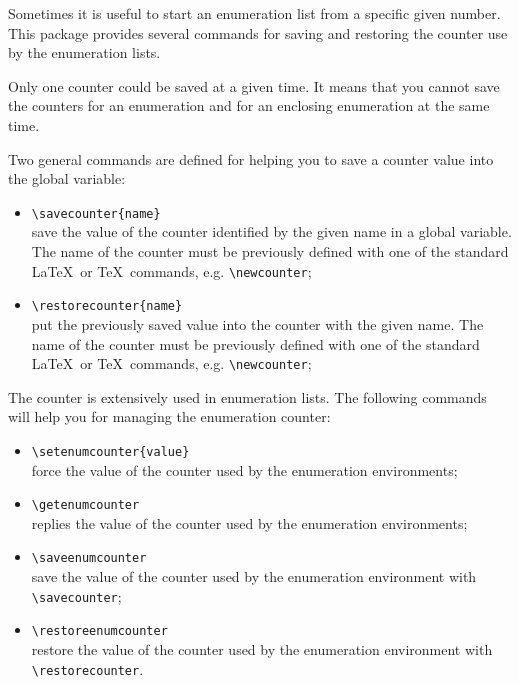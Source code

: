 \documentclass[book,taskpackage,specpackage,codepackage]{upmethodology-document}
\begin{document}
Sometimes it is useful to start an enumeration list from a specific given number. This package provides several commands for saving and restoring the counter use by the enumeration lists.

\begin{upmcaution}
Only one counter could be saved at a given time.
It means that you cannot save the counters for an enumeration and for an enclosing enumeration at the same time.
\end{upmcaution}

Two general commands are defined for helping you to save a counter value into the global variable: 
\begin{itemize}
\item \texttt{{\textbackslash}savecounter\{name\}} \\
	save the value of the counter identified by the given name in a global variable.
	The name of the counter must be previously defined with one of the standard \LaTeX\ or \TeX\ commands, e.g. \texttt{{\textbackslash}newcounter};
\item \texttt{{\textbackslash}restorecounter\{name\}} \\
	put the previously saved value into the counter with the given name.
	The name of the counter must be previously defined with one of the standard \LaTeX\ or \TeX\ commands, e.g. \texttt{{\textbackslash}newcounter};
\end{itemize}

The counter is extensively used in enumeration lists. The following commands will help you for managing the enumeration counter:
\begin{itemize}
\item \texttt{{\textbackslash}setenumcounter\{value\}} \\
	force the value of the counter used by the enumeration environments;
\item \texttt{{\textbackslash}getenumcounter} \\
	replies the value of the counter used by the enumeration environments;
\item \texttt{{\textbackslash}saveenumcounter} \\
	save the value of the counter used by the enumeration environment with \texttt{{\textbackslash}savecounter};
\item \texttt{{\textbackslash}restoreenumcounter} \\
	restore the value of the counter used by the enumeration environment with \texttt{{\textbackslash}restorecounter}.
\end{itemize}
\end{document}
